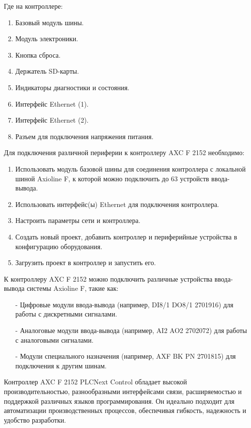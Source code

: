 Где на контроллере:

\begin{enumerate}
    \item Базовый модуль шины.
    \item Модуль электроники.
    \item Кнопка сброса.
    \item Держатель SD-карты.
    \item Индикаторы диагностики и состояния.
    \item Интерфейс Ethernet (1).
    \item Интерфейс Ethernet (2).
    \item Разъем для подключения напряжения питания.
\end{enumerate}

Для подключения различной периферии к контроллеру AXC F 2152 необходимо:

\begin{enumerate} 
    \item Использовать модуль базовой шины для соединения контроллера с локальной шиной Axioline F, к которой можно подключить до 63 устройств ввода-вывода.
    \item Использовать интерфейс(ы) Ethernet для подключения контроллера.
    \item Настроить параметры сети и контроллера.
    \item Создать новый проект, добавить контроллер и периферийные устройства в конфигурацию оборудования.
    \item Загрузить проект в контроллер и запустить его.
\end{enumerate}

К контроллеру AXC F 2152 можно подключить различные устройства ввода-вывода системы Axioline F, такие как:

\begin{itemize}
    \item[-] Цифровые модули ввода-вывода (например, DI8/1 DO8/1 2701916) для работы с дискретными сигналами. 
    \item[-] Аналоговые модули ввода-вывода (например, AI2 AO2 2702072) для работы с аналоговыми сигналами. 
    \item[-] Модули специального назначения (например, AXF BK PN 2701815) для подключения к другим шинам.
\end{itemize}

Контроллер AXC F 2152 PLCNext Control обладает высокой производительностью, разнообразными интерфейсами связи, расширяемостью и поддержкой различных языков программирования. Он идеально подходит для автоматизации производственных процессов, обеспечивая гибкость, надежность и удобство разработки.

